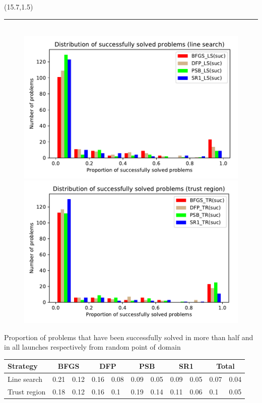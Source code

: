 \documentclass[a0]{a0poster}
\def\Head#1{\noindent{\LARGE\color{bluegray} #1}\bigskip}
\begin{document}
\begin{textblock}{7.1}(15.7,1.5)
\hrule\medskip
\Head{Results}
		
\begin{figure}
	\
	\includegraphics[width=.55\textwidth]{pic/distr_line_search.pdf}
	\includegraphics[width=.55\textwidth]{pic/distr_trust_region.pdf}%
\end{figure}

Proportion of problems that have been successfully solved in more than half and in all launches respectively from random point of domain


\begin{flushleft}
	\begin{tabular}{ p{5cm} |p{2cm}|p{2cm}|p{2cm}|p{2cm}|p{2cm}|p{2cm}|p{2cm}|p{2cm}|p{2cm}|p{2cm} }
		Strategy	& \multicolumn{2}{c|}{BFGS} & \multicolumn{2}{c|}{DFP} & \multicolumn{2}{c|}{PSB} & \multicolumn{2}{c|}{SR1} & \multicolumn{2}{c}{Total}\\
		\hline
		Line search &0.21 &0.12& 0.16 &0.08&0.09 &0.05&0.09 &0.05&0.07 &0.04\\
		\hline
		Trust region&0.18&0.12&0.16&0.1& 0.19&0.14&0.11&0.06&0.1&0.05
	\end{tabular}
\end{flushleft}


\end{textblock}
\end{document}
